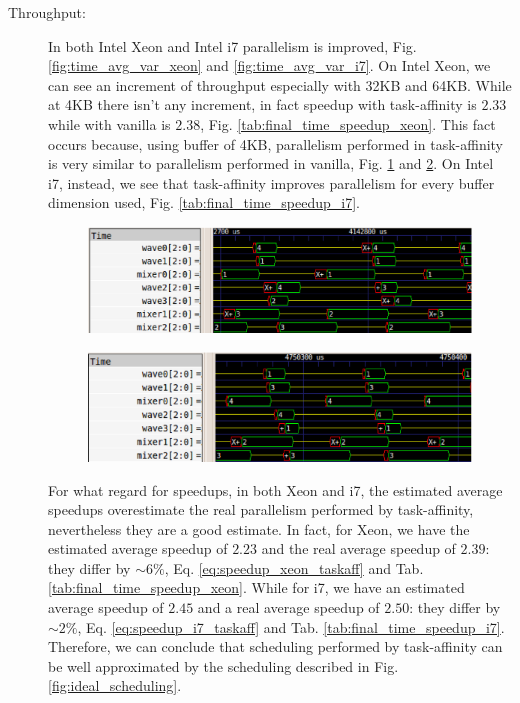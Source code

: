 \begin{description}

\item[Throughput:] In both Intel Xeon and Intel i7 parallelism is improved, Fig. \ref{fig:time_avg_var_xeon} and \ref{fig:time_avg_var_i7}. On Intel Xeon, 
we can see an increment of throughput especially with 32KB and 64KB. While at 4KB there isn't any increment, in fact speedup with task-affinity is $2.33$ 
while with vanilla is $2.38$, Fig. \ref{tab:final_time_speedup_xeon}. This fact occurs because, using buffer of 4KB, parallelism performed in task-affinity 
is very similar to parallelism performed in vanilla, Fig. \ref{fig:4KB_xeon_results_taskaff} and \ref{fig:4KB_xeon_results_van}. On Intel i7, instead, we 
see that task-affinity improves parallelism for every buffer dimension used, Fig. \ref{tab:final_time_speedup_i7}.

\begin{figure}[htbp]
\centering
\includegraphics[width=\widefigure]{images/results_xeon/4KB_results_xeon_taskaff.eps}
\caption{}
\label{fig:4KB_xeon_results_taskaff}
\end{figure}

\begin{figure}[htbp]
\centering
\includegraphics[width=\widefigure]{images/results_xeon/4KB_results_xeon_van.eps}
\caption{}
\label{fig:4KB_xeon_results_van}
\end{figure}

For what regard for speedups, in both Xeon and i7, the estimated average speedups overestimate the real parallelism performed by task-affinity, nevertheless
they are a good estimate. In fact, for Xeon, we have the estimated average speedup of $2.23$ and the real average speedup of $2.39$: they 
differ by $\sim 6\%$, Eq. \ref{eq:speedup_xeon_taskaff} and Tab. \ref{tab:final_time_speedup_xeon}. While for i7, we have an estimated average speedup of 
$2.45$ and a real average speedup of $2.50$: they differ by $\sim 2\%$, Eq. \ref{eq:speedup_i7_taskaff} and Tab. \ref{tab:final_time_speedup_i7}. Therefore, 
we can conclude that scheduling performed by task-affinity can be well approximated by the scheduling described in Fig. \ref{fig:ideal_scheduling}.


\end{description}
